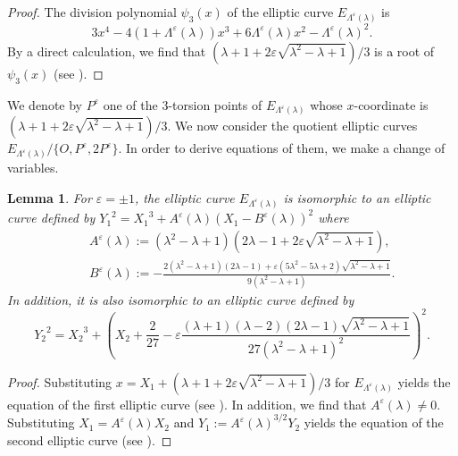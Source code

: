 \documentclass[a4paper, 11pt]{article}
\theoremstyle{plain}
\newtheorem{lem}[defn]{Lemma}
\newcommand{\?}{\textcolor{red}{??}}
\newcommand{\lm}{\lambda}
\newcommand{\Lm}{\Lambda}
\begin{document}
\begin{proof}
    The division polynomial ${\psi}_3(x)$ of the elliptic curve $E_{\Lambda^{\varepsilon}(\lm)}$ is
    \[
    3{x}^4-4(1+\Lambda^{\varepsilon}(\lm)){x}^3+6\Lambda^{\varepsilon}(\lm) {x}^2 -{\Lambda^{\varepsilon}(\lm)}^2.
    \]
    By a direct calculation, we find that $(\lm+1+2\varepsilon\sqrt{{\lm}^2-\lm+1})/3$ is \textcolor{black}{a} root of ${\psi}_3(x)$ (see \cite[1]{Github}).
\end{proof}
We denote by $P^{\varepsilon}$ one of the $3$-torsion points of $E_{\Lambda^{\varepsilon}(\lm)}$ whose $x$-coordinate is $(\lm+1+2\varepsilon\sqrt{{\lm}^2-\lm+1})/3$. We now consider the quotient elliptic curves $E_{\Lm^{\varepsilon}(\lm)}/\{O,P^{\varepsilon},2P^{\varepsilon}\}$. In order to derive equations of them, we make a change of variables. 
\begin{lem}
\label{change_form3}
   For $\varepsilon=\pm1$, the elliptic curve $E_{\Lm^{\varepsilon}(\lm)}$ is isomorphic to an elliptic curve defined by $
    {Y_1}^2={X_1}^3+A^{\varepsilon}(\lm)\left(X_1-B^{\varepsilon}(\lm) \right)^2
    $ where 
   \begin{eqnarray*}
       && A^{\varepsilon}(\lm):=\left({\lm}^2-\lm+1\right)\left(2{\lm}-1+2\varepsilon\sqrt{{\lm}^2-\lm+1} \right),\\
       && B^{\varepsilon}(\lm):=-\frac{2({\lm}^2-\lm+1)(2\lm-1) +\varepsilon(5{\lm}^2- 5\lm  + 2 )\sqrt{{\lm}^2-\lm+1}}{9({\lm}^2-\lm+1)}.
   \end{eqnarray*}
   In addition, it is also isomorphic to an elliptic curve defined by
    \[
    {Y_2}^2={X_2}^3+\left(X_2+\frac{2}{27}-\varepsilon\frac{(\lm+1)(\lm-2)(2\lm-1)\sqrt{{\lm}^2-\lm+1}}{27({\lm}^2-\lm+1)^2} \right)^2.
    \]
\end{lem}

\begin{proof}
    Substituting $x=X_1+(\lm+1+2\varepsilon\sqrt{{\lm}^2-\lm+1})/3$ for $E_{\Lm^{\varepsilon}(\lm)}$ yields the equation of the first elliptic curve (see \cite[2-1,2-2]{Github}).  In addition, we find that $A^{\varepsilon}(\lm) \ne 0$. %
    Substituting $X_1=A^{\varepsilon}(\lm)X_2$ \textcolor{black}{and} $Y_1:={A^{\varepsilon}(\lm)}^{3/2}Y_2$ yields the equation of the second elliptic curve (see \cite[3-1,3-2]{Github}).
\end{proof}
\end{document}
